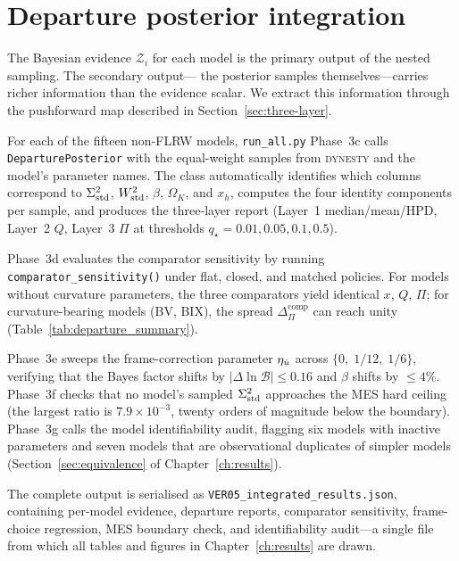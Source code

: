 \section{Departure posterior integration}
\label{sec:departure-integration}

The Bayesian evidence $\mathcal{Z}_i$ for each model is the
primary output of the nested sampling.  The secondary output---
the posterior samples themselves---carries richer information
than the evidence scalar.  We extract this information through
the pushforward map described in
Section~\ref{sec:three-layer}.

For each of the fifteen non-FLRW models, \texttt{run\_all.py}
Phase~3c calls \texttt{DeparturePosterior} with the equal-weight
samples from \textsc{dynesty} and the model's parameter names.
The class automatically identifies which columns correspond to
$\Sigma^2_{\mathrm{std}}$, $W^2_{\mathrm{std}}$, $\beta$, $\Omega_K$, and $x_h$, computes
the four identity components per sample, and produces the
three-layer report (Layer~1 median/mean/HPD, Layer~2
$Q$, Layer~3 $\Pi$ at thresholds $q_\star = 0.01, 0.05, 0.1, 0.5$).

Phase~3d evaluates the comparator sensitivity by running
\texttt{comparator\_sensitivity()} under flat, closed, and
matched policies.  For models without curvature parameters, the
three comparators yield identical $x$, $Q$, $\Pi$; for
curvature-bearing models (BV, BIX), the spread
$\Delta_\Pi^{\mathrm{comp}}$ can reach unity
(Table~\ref{tab:departure_summary}).

Phase~3e sweeps the frame-correction parameter $\eta_{\dot{u}}$ across
$\{0,\; 1/12,\; 1/6\}$, verifying that the Bayes factor shifts
by $|\Delta\ln\mathcal{B}| \leq 0.16$ and $\beta$ shifts by
$\leq 4\%$.  Phase~3f checks that no model's sampled $\Sigma^2_{\mathrm{std}}$
approaches the MES hard ceiling (the largest ratio is
$7.9 \times 10^{-3}$, twenty orders of magnitude below the
boundary).  Phase~3g calls the model identifiability audit,
flagging six models with inactive parameters and seven models
that are observational duplicates of simpler models
(Section~\ref{sec:equivalence} of Chapter~\ref{ch:results}).

The complete output is serialised as
\texttt{VER05\_integrated\_results.json}, containing per-model
evidence, departure reports, comparator sensitivity,
frame-choice regression, MES boundary check, and identifiability
audit---a single file from which all tables and figures in
Chapter~\ref{ch:results} are drawn.


